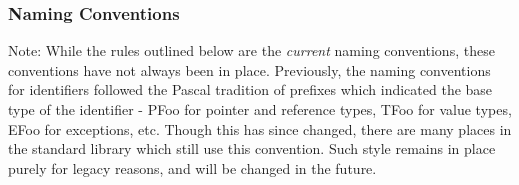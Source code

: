 \hypertarget{naming-conventions}{%
\subsubsection{Naming Conventions}\label{naming-conventions}}

Note: While the rules outlined below are the \emph{current} naming
conventions, these conventions have not always been in place.
Previously, the naming conventions for identifiers followed the Pascal
tradition of prefixes which indicated the base type of the identifier -
PFoo for pointer and reference types, TFoo for value types, EFoo for
exceptions, etc. Though this has since changed, there are many places in
the standard library which still use this convention. Such style remains
in place purely for legacy reasons, and will be changed in the future.

